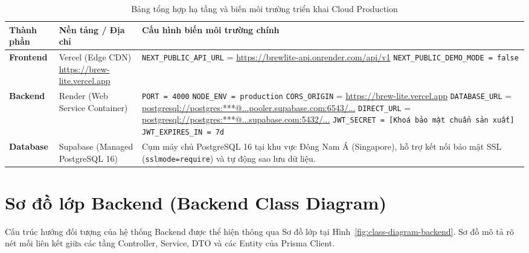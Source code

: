 \documentclass[12pt,a4paper,oneside]{report}
\begin{document}
\begin{table}[htbp]
\centering
\small
\caption{Bảng tổng hợp hạ tầng và biến môi trường triển khai Cloud Production}
\label{tab:cloud-deployment-env}
\begin{tabularx}{\textwidth}{lp{3.2cm}X}
\toprule
\textbf{Thành phần} & \textbf{Nền tảng / Địa chỉ} & \textbf{Cấu hình biến môi trường chính} \\
\midrule
\textbf{Frontend} & Vercel (Edge CDN) \newline \url{https://brew-lite.vercel.app} & 
\texttt{NEXT\_PUBLIC\_API\_URL} = \newline \url{https://brewlite-api.onrender.com/api/v1} \newline
\texttt{NEXT\_PUBLIC\_DEMO\_MODE = false} \\
\midrule
\textbf{Backend} & Render \newline (Web Service Container) & 
\texttt{PORT = 4000} \newline
\texttt{NODE\_ENV = production} \newline
\texttt{CORS\_ORIGIN} = \url{https://brew-lite.vercel.app} \newline
\texttt{DATABASE\_URL} = \newline \url{postgresql://postgres:***@...pooler.supabase.com:6543/...} \newline
\texttt{DIRECT\_URL} = \newline \url{postgresql://postgres:***@...supabase.com:5432/...} \newline
\texttt{JWT\_SECRET = [Khoá bảo mật chuẩn sản xuất]} \newline
\texttt{JWT\_EXPIRES\_IN = 7d} \\
\midrule
\textbf{Database} & Supabase \newline (Managed PostgreSQL 16) & Cụm máy chủ PostgreSQL 16 tại khu vực Đông Nam Á (Singapore), hỗ trợ kết nối bảo mật SSL (\texttt{sslmode=require}) và tự động sao lưu dữ liệu. \\
\bottomrule
\end{tabularx}
\end{table}

\clearpage
\section{Sơ đồ lớp Backend (Backend Class Diagram)}
Cấu trúc hướng đối tượng của hệ thống Backend được thể hiện thông qua Sơ đồ lớp tại Hình~\ref{fig:class-diagram-backend}. Sơ đồ mô tả rõ nét mối liên kết giữa các tầng Controller, Service, DTO và các Entity của Prisma Client.
\end{document}
